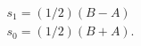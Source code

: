 \begin{equation}
\begin{array}{l}
    s_1=(1/2)(B-A) \\
    s_0=(1/2)(B+A).
  \end{array}
\end{equation}

